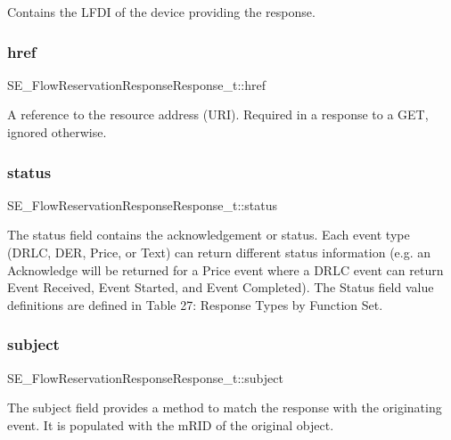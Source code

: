 Contains the L\+F\+DI of the device providing the response. \mbox{\label{group__FlowReservationResponseResponse_gadab170c7a69f833a7b7db7247f400305}} 
\subsubsection{\texorpdfstring{href}{href}}
{\footnotesize\ttfamily S\+E\+\_\+\+Flow\+Reservation\+Response\+Response\+\_\+t\+::href}

A reference to the resource address (U\+RI). Required in a response to a G\+ET, ignored otherwise. \mbox{\label{group__FlowReservationResponseResponse_ga5ecdbb63ff59d85cf982562cec5c3a5a}} 
\subsubsection{\texorpdfstring{status}{status}}
{\footnotesize\ttfamily S\+E\+\_\+\+Flow\+Reservation\+Response\+Response\+\_\+t\+::status}

The status field contains the acknowledgement or status. Each event type (D\+R\+LC, D\+ER, Price, or Text) can return different status information (e.\+g. an Acknowledge will be returned for a Price event where a D\+R\+LC event can return Event Received, Event Started, and Event Completed). The Status field value definitions are defined in Table 27\+: Response Types by Function Set. \mbox{\label{group__FlowReservationResponseResponse_ga177ff4d3fb0d3e1ece98061c9bcfcb6c}} 
\subsubsection{\texorpdfstring{subject}{subject}}
{\footnotesize\ttfamily S\+E\+\_\+\+Flow\+Reservation\+Response\+Response\+\_\+t\+::subject}

The subject field provides a method to match the response with the originating event. It is populated with the m\+R\+ID of the original object. 
